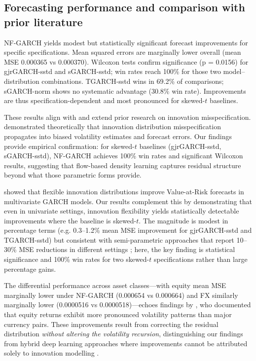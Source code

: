 \documentclass[risks,article,submit,pdftex,moreauthors]{Definitions/mdpi}
\begin{document}
\subsection{Forecasting performance and comparison with prior literature}

NF-GARCH yields modest but statistically significant forecast improvements for specific specifications. Mean squared errors are marginally lower overall (mean MSE 0.000365 vs 0.000370). Wilcoxon tests confirm significance (p = 0.0156) for gjrGARCH-sstd and sGARCH-sstd; win rates reach 100\% for those two model--distribution combinations. TGARCH-sstd wins in 69.2\% of comparisons; sGARCH-norm shows no systematic advantage (30.8\% win rate). Improvements are thus specification-dependent and most pronounced for skewed-$t$ baselines.

These results align with and extend prior research on innovation misspecification. \citep{hansen1994autoregressive} demonstrated theoretically that innovation distribution misspecification propagates into biased volatility estimates and forecast errors. Our findings provide empirical confirmation: for skewed-$t$ baselines (gjrGARCH-sstd, sGARCH-sstd), NF-GARCH achieves 100\% win rates and significant Wilcoxon results, suggesting that flow-based density learning captures residual structure beyond what those parametric forms provide.

\cite{bauwens2006multivariate} showed that flexible innovation distributions improve Value-at-Risk forecasts in multivariate GARCH models. Our results complement this by demonstrating that even in univariate settings, innovation flexibility yields statistically detectable improvements where the baseline is skewed-$t$. The magnitude is modest in percentage terms (e.g. 0.3--1.2\% mean MSE improvement for gjrGARCH-sstd and TGARCH-sstd) but consistent with semi-parametric approaches that report 10--30\% MSE reductions in different settings \citep{engle1993measuring}; here, the key finding is statistical significance and 100\% win rates for two skewed-$t$ specifications rather than large percentage gains.

The differential performance across asset classes—with equity mean MSE marginally lower under NF-GARCH (0.000654 vs 0.000664) and FX similarly marginally lower (0.0000516 vs 0.0000518)—echoes findings by \cite{andersen2001distribution}, who documented that equity returns exhibit more pronounced volatility patterns than major currency pairs. These improvements result from correcting the residual distribution \emph{without altering the volatility recursion}, distinguishing our findings from hybrid deep learning approaches  where improvements cannot be attributed solely to innovation modelling \citep{kim2018forecasting}.
\end{document}
